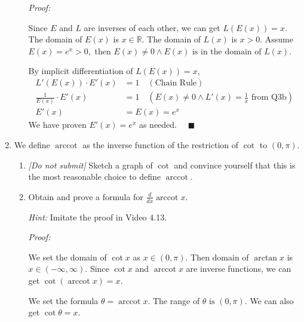 \documentclass[12pt]{exam}
\newcommand {\DS} [1] {${\displaystyle #1}$}
\newcommand{\vv}{\vspace{.1cm}}
\newcommand{\R}{\mathbb{R}}
\DeclareMathOperator{\arccot}{arccot}
\begin{document}
\begin{enumerate}
\begin{enumerate}
	    \emph{Proof:}
	    
	    \vv
	    
	    Since $E$ and $L$ are inverses of each other, we can get $L(E(x))=x.$ The domain of $E(x)$ is $x\in\R.$ The domain of $L(x)$ is $x > 0.$ Assume $E(x)=e^x>0,\mbox{ then } E(x)\neq0 \land E(x)\mbox{ is in the domain of } L(x).$
	    
	    By implicit differentiation of $L(E(x))=x$, 
	    \begin{align*}
	        L'(E(x))\cdot E'(x)&=1\quad(\mbox{Chain Rule})\\
	        \frac{1}{E(x)}\cdot E'(x)&=1\quad(E(x)\neq0 \land L'(x)=\frac{1}{x}\mbox{ from Q3b})\\
	        E'(x)&=E(x)=e^x
	    \end{align*}
	    We have proven $E'(x)=e^x$ as needed. $\quad\blacksquare$
	\end{enumerate}

\vv
\newpage

\item  We define $\arccot$ as the inverse function of the restriction of $\cot$ to \DS{(0, \pi)}.
	\begin{enumerate}
		\item \emph{[Do not submit]}  Sketch a graph of $\cot$ and convince yourself that this is the most reasonable choice to define $\arccot$.
		\item   Obtain and prove a formula for \DS{\frac{d}{dx} \arccot x}.
		
			\emph{Hint:}  Imitate the proof in Video 4.13.
		
		\vv
		
		\emph{Proof:}
		
		\vv
		
		We set the domain of $\cot x$ as $x\in(0,\pi).$ Then domain of $\arctan x$ is $x\in(-\infty,\infty).$ Since $\cot x$ and $\arccot x$ are inverse functions, we can get $\cot(\arccot x)=x.$
		
		We set the formula $\theta=\arccot{x}$. The range of $\theta \mbox{ is } (0, \pi)$. We can also get $\cot\theta=x$.
		

\end{enumerate}
\end{enumerate}
\end{document}
